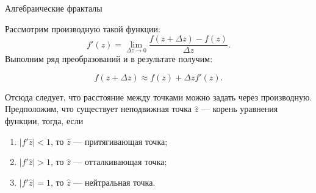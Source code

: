 \documentclass{beamer}
\begin{document}
	\begin{frame}{Алгебраические фракталы}

		Рассмотрим производную такой функции:
		\[
			f'(z) = \lim_{\Delta z \to 0} \frac{f(z + \Delta z)-f(z)}{\Delta z}
			.
		\]
		Выполним ряд преобразований и в результате получим:

		\[
			f(z + \Delta z) \approx f(z) + \Delta z f'(z) 
			.
		\]

		Отсюда следует, что расстояние между точками можно задать через производную.
		Предположим, что существует неподвижная точка $\hat{z}$ --- корень уравнения функции, тогда, если
\begin{enumerate}
\item $|f' \hat{z} | < 1$, то $\hat{z}$ --- притягивающая точка;
\item $|f'\hat{z}| > 1$, то $\hat{z}$ --- отталкивающая точка;
\item $|f'\hat{z}| = 1$, то $\hat{z}$ --- нейтральная точка.
\end{enumerate}
		

	\end{frame}
\end{document}
